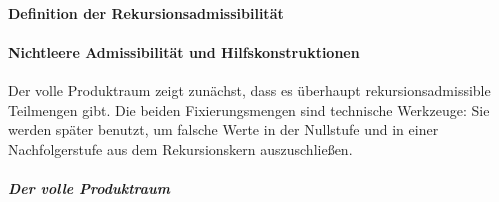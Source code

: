 \documentclass[main.tex]{subfiles}
\begin{document}
\paragraph{Definition der Rekursionsadmissibilität}


\paragraph{Nichtleere Admissibilität und Hilfskonstruktionen}

Der volle Produktraum zeigt zunächst, dass es überhaupt rekursionsadmissible
Teilmengen gibt. Die beiden Fixierungsmengen sind technische Werkzeuge: Sie
werden später benutzt, um falsche Werte in der Nullstufe und in einer
Nachfolgerstufe aus dem Rekursionskern auszuschließen.

\subparagraph{Der volle Produktraum}
\end{document}
